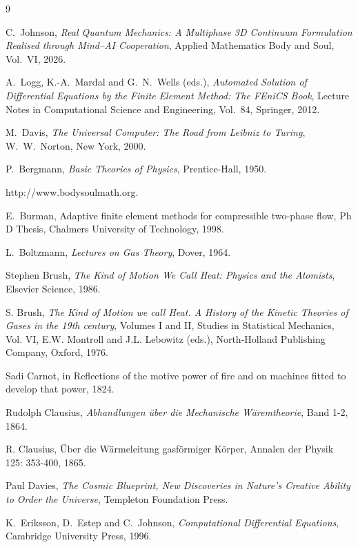 \begin{thebibliography}{9}

 C.~Johnson, \emph{Real Quantum Mechanics: A
Multiphase 3D Continuum Formulation Realised through Mind--AI
Cooperation}, Applied Mathematics Body and Soul, Vol.~VI, 2026.

 A.~Logg, K.-A.~Mardal and G.~N.~Wells (eds.),
\emph{Automated Solution of Differential Equations by the Finite Element
Method: The FEniCS Book}, Lecture Notes in Computational Science and
Engineering, Vol.~84, Springer, 2012.

 M.~Davis, \emph{The Universal Computer: The Road
from Leibniz to Turing}, W.~W.~Norton, New York, 2000.

 P.~Bergmann, \emph{Basic Theories of Physics},
Prentice-Hall, 1950.

 http://www.bodysoulmath.org.

 E.~Burman, Adaptive finite element methods
for compressible two-phase flow, Ph D Thesis, Chalmers University of Technology,
1998.

L.~Boltzmann, \emph{Lectures on Gas Theory}, Dover, 1964.

 Stephen Brush, \emph{The Kind of Motion We Call Heat: Physics
and the Atomists}, Elsevier Science, 1986.

 S. Brush, \emph{The Kind of Motion we call Heat. 
A History of the Kinetic Theories of Gases in the 19th century}, 
Volumes I and II, Studies in Statistical Mechanics, Vol. VI, 
E.W. Montroll and J.L. Lebowitz (eds.), North-Holland 
Publishing Company, Oxford, 1976.

 Sadi Carnot, in Reflections of the motive power of fire and 
on machines fitted to develop that power, 1824.

 Rudolph Clausius, \emph{Abhandlungen \"uber die
Mechanische W\"aremtheorie}, Band 1-2, 1864.

 R. Clausius, 
\"Uber die W\"armeleitung gasf\"ormiger K\"orper, 
Annalen der Physik 125: 353-400, 1865.


 Paul Davies, \emph{The Cosmic Blueprint,
New Discoveries in Nature's Creative Ability to Order the Universe},
Templeton Foundation Press.

 K.~Eriksson, D.~Estep and C.~Johnson, \emph{Computational
Differential Equations}, Cambridge University Press, 1996. 



\end{thebibliography}
